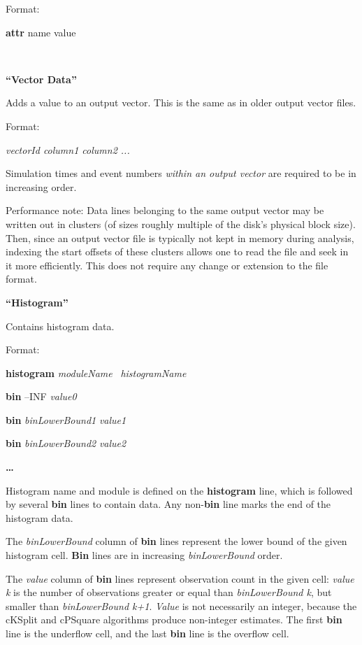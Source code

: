 Format:

\textbf{attr} name value

\


\bigskip

{\bfseries
``Vector Data''}

Adds a value to an output vector. This is the same as in older output
vector files.

Format:

{\itshape vectorId column1 column2 ...}

Simulation times and event numbers \textit{within an output vector} are
required to be in increasing order.

Performance note: Data lines belonging to the same output vector may be
written out in clusters (of sizes roughly multiple of the disk's
physical block size). Then, since an output vector file is typically
not kept in memory during analysis, indexing the start offsets of these
clusters allows one to read the file and seek in it more efficiently.
This does not require any change or extension to the file format.

\bigskip

{\bfseries ``Histogram''}

Contains histogram data.

Format:

\textbf{histogram} \textit{moduleName} \ \textit{histogramName}

\textbf{bin} {--}INF \textit{value0}

\textbf{bin} \textit{binLowerBound1} \textit{value1}

\textbf{bin} \textit{binLowerBound2} \textit{value2}

{\bfseries {\dots}}

Histogram name and module is defined on the \textbf{histogram} line,
which is followed by several \textbf{bin} lines to contain data. Any
non{}-\textbf{bin} line marks the end of the histogram data.

The \textit{binLowerBound }column of \textbf{bin} lines represent the
lower bound of the given histogram cell. \textbf{Bin} lines are in
increasing \textit{binLowerBound} order.

The \textit{value} column of \textbf{bin} lines represent observation
count in the given cell: \textit{value k} is the number of observations
greater or equal than \textit{binLowerBound k}, but smaller than
\textit{binLowerBound k+1}. \textit{Value} is not necessarily an
integer, because the cKSplit and cPSquare algorithms produce
non{}-integer estimates. The first \textbf{bin} line is the underflow
cell, and the last \textbf{bin} line is the overflow cell.



